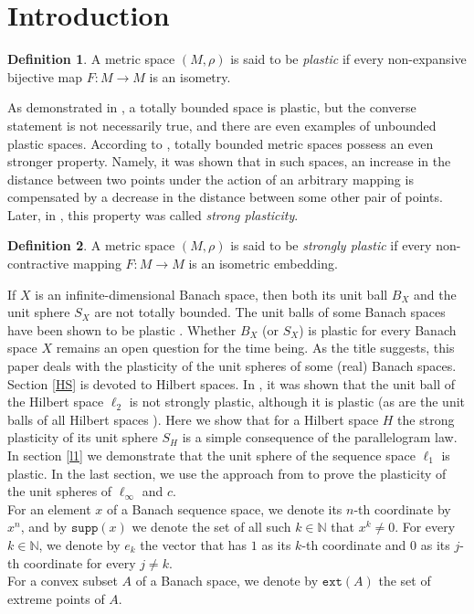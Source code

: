 \documentclass[reqno]{amsart}
\theoremstyle{plain}
\theoremstyle{remark}
\theoremstyle{definition}
\newtheorem*{definition}{Definition}
\newcommand{\N}{\mathbb N}
\begin{document}
\section{Introduction}
\begin{definition}
A metric space $(M,\rho)$ is said to be \textit{plastic} if every non-expansive bijective map $F:M \rightarrow M$ is an isometry.
\end{definition}
As demonstrated in \cite{plastms}, a totally bounded space is plastic, but the converse statement is not necessarily true, and there are even examples of unbounded plastic spaces.
According to \cite{plastms}, totally bounded metric spaces possess an even stronger property. Namely, it was shown that in such spaces, an increase in the distance between two points under the action of an arbitrary mapping is compensated by a decrease in the distance between some other pair of points. Later, in \cite{str_pl}, this property was called \textit{strong plasticity}.
\begin{definition}
A metric space $(M,\rho)$ is said to be \textit{strongly plastic} if every non-contractive mapping $F:M \rightarrow M$ is an isometric embedding.
\end{definition}
If $X$ is an infinite-dimensional Banach space, then both its unit ball $B_X$ and the unit sphere $S_X$ are not totally bounded. The unit balls of some Banach spaces have been shown to be plastic \cite{casc,l1ball,l1sum,ang,leoc,2new,fakh}. Whether $B_X$ (or $S_X$) is plastic for every Banach space $X$ remains an open question for the time being.  As the title suggests, this paper deals with the plasticity of the unit spheres of some (real) Banach spaces. \\
Section \ref{HS} is devoted to Hilbert spaces. In  \cite{str_pl}, it was shown that the unit ball of the Hilbert space $\ell_2$ is not strongly plastic, although it is plastic (as are the unit balls of all Hilbert spaces \cite{casc}). Here we show that for a Hilbert space $H$ the  strong plasticity of its unit sphere $S_H$ is a simple consequence of the parallelogram law.  In section \ref{l1} we demonstrate that the unit sphere of the sequence space $\ell_1$ is plastic. In the last section, we use the approach from \cite{leoc} to prove the plasticity of the unit spheres of $\ell_\infty$ and $c$. \\
For an element $x$ of a Banach sequence space, we denote its $n$-th coordinate by $x^n$, and by $\mathtt{supp}(x)$ we denote the set of all such $k \in \N$ that $x^k \neq 0$. For every $k \in \N$, we denote by $e_k$ the vector that has $1$ as its $k$-th coordinate and $0$ as its $j$-th coordinate for every $j \neq k$.\\
For a convex subset $A$ of a Banach space, we denote by $\mathtt{ext}(A)$ the set of extreme points of $A$.
\end{document}
